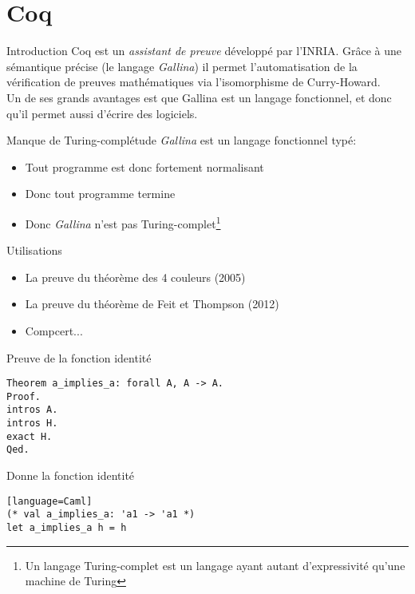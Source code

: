 \documentclass[11pt,a4paper]{beamer}
\theoremstyle{plain}
\theoremstyle{definition}
\theoremstyle{remark}
\begin{document}
\section{Coq}

\begin{frame}{Introduction}
Coq est un \emph{assistant de preuve} développé par l'INRIA. Grâce à une sémantique précise (le langage \emph{Gallina}) il permet l'automatisation de la vérification de preuves mathématiques via l'isomorphisme de Curry-Howard.\\
Un de ses grands avantages est que Gallina est un langage fonctionnel, et donc qu'il permet aussi d'écrire des logiciels.
\end{frame}

\begin{frame}{Manque de Turing-complétude}
\emph{Gallina} est un langage fonctionnel typé:
\begin{itemize}
	\item Tout programme est donc fortement normalisant
	\item Donc tout programme termine
	\item Donc \emph{Gallina} n'est pas Turing-complet\footnote{Un langage Turing-complet est un langage ayant autant d'expressivité qu'une machine de Turing}
\end{itemize}

\end{frame}

\begin{frame}{Utilisations}
	\begin{itemize}
		\item La preuve du théorème des 4 couleurs (2005)
		\item La preuve du théorème de Feit et Thompson (2012)
		\item Compcert...
	\end{itemize}
\end{frame}

\begin{frame}[fragile]{Preuve de la fonction identité}
\begin{lstlisting}[frame=single]
Theorem a_implies_a: forall A, A -> A.
Proof.
intros A.
intros H.
exact H.
Qed.
\end{lstlisting}

Donne la fonction identité
\begin{lstlisting}[frame=single][language=Caml]
(* val a_implies_a: 'a1 -> 'a1 *)
let a_implies_a h = h
\end{lstlisting}
\end{frame}
\end{document}
